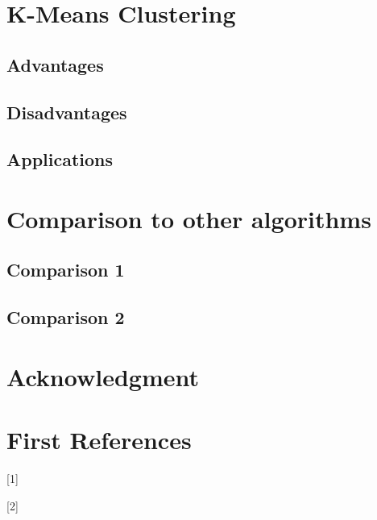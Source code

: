 \documentclass[conference]{IEEEtran}
\begin{document}
\section{K-Means Clustering}

\subsection{Advantages}

\subsection{Disadvantages}

\subsection{Applications}

\section{Comparison to other algorithms}

\subsection{Comparison 1}

\subsection{Comparison 2}

\section*{Acknowledgment}

\section{First References}

[1] \cite{madhulatha2012overview}

[2] \cite{muller2016introduction}


\end{document}

